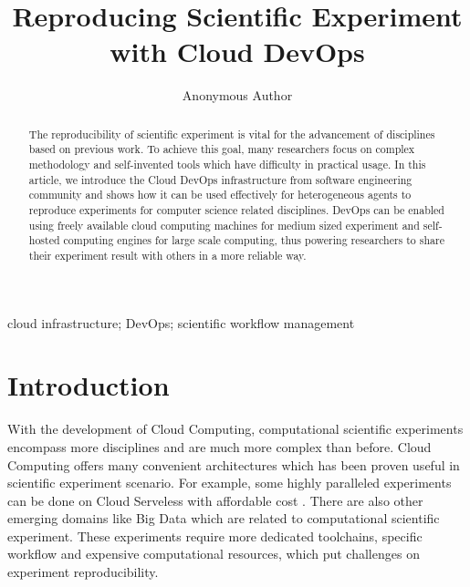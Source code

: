 \documentclass[10pt, conference, compsocconf]{IEEEtran}
\begin{document}
\title{Reproducing Scientific Experiment with Cloud DevOps}

\author{Anonymous Author}
\author{
\and
{}
\and
{}
\and
{}
}
\maketitle
\begin{abstract}
The reproducibility of scientific experiment is vital for the advancement of disciplines based on previous work. To achieve this goal, many researchers focus on complex methodology and self-invented tools which have difficulty in practical usage. In this article, we introduce the Cloud DevOps infrastructure from software engineering community and shows how it can be used effectively for heterogeneous agents to reproduce experiments for computer science related disciplines. DevOps can be enabled using freely available cloud computing machines for medium sized experiment and self-hosted computing engines for large scale computing, thus powering researchers to share their experiment result with others in a more reliable way.
\end{abstract}
\begin{IEEEkeywords}
cloud infrastructure; DevOps; scientific workflow management
\end{IEEEkeywords}

\section{Introduction}
With the development of Cloud Computing, computational scientific experiments encompass more disciplines and are much more complex than before. Cloud Computing offers many convenient architectures which has been proven useful in scientific experiment scenario.  For example, some highly paralleled experiments can be done on Cloud Serveless with affordable cost \cite{niu2019leveraging}. There are also other emerging domains like Big Data which are related to computational scientific experiment. These experiments require more dedicated toolchains, specific workflow and expensive computational resources, which put challenges on experiment reproducibility.
\end{document}
